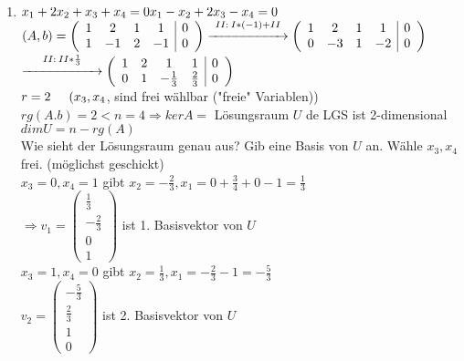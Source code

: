 \documentclass[a4paper,11pt]{article}
\begin{document}
\begin{enumerate}[label=\alph*)]
\item $x_1+2x_2+x_3+x_4=0\\
x_1-x_2+2x_3-x_4=0$ \\
$(A,b)=\left(\begin{array}{cccc|c}1&2&1&1&0\\1&-1&2&-1&0\end{array}\right)\overset{II:\:I*(-1)+II}{\xrightarrow{\hspace*{2cm}}}\left(\begin{array}{cccc|c}1&2&1&1&0\\0&-3&1&-2&0\end{array}\right)$ \\
$\overset{II:\:II*\frac{1}{3}}{\xrightarrow{\hspace*{2cm}}}\left(\begin{array}{cccc|c}1&2&1&1&0\\0&1&-\frac{1}{3}&\frac{2}{3}&0\end{array}\right)$ \\
$r=2\hspace{5mm}(x_3,x_4$, sind frei wählbar ("freie" Variablen)) \\
$rg(A.b)=2<n=4\Rightarrow kerA=$ Lösungsraum $U$ de LGS ist 2-dimensional \\
$dimU=n-rg(A)$ \\
Wie sieht der Lösungsraum genau aus? Gib eine Basis von $U$ an. Wähle $x_3,x_4$ frei. (möglichst geschickt) \\
$x_3=0,x_4=1$ gibt $x_2=-\frac{2}{3}, x_1=0+\frac{3}{4}+0-1=\frac{1}{3}$ \\
$\Rightarrow v_1=\begin{pmatrix}\frac{1}{3}\\-\frac{2}{3}\\0\\1\end{pmatrix}$ ist 1. Basisvektor von $U$ \\
$x_3=1,x_4=0$ gibt $x_2=\frac{1}{3},x_1=-\frac{2}{3}-1=-\frac{5}{3}$ \\
$v_2=\begin{pmatrix}-\frac{5}{3}\\\frac{2}{3}\\1\\0\end{pmatrix}$ ist 2. Basisvektor von $U$ \\

\end{enumerate}
\end{document}
